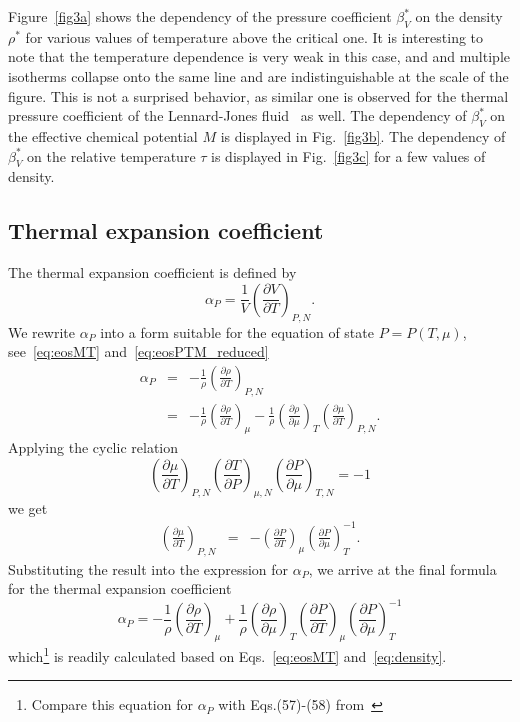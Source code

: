 Figure~\ref{fig3a} shows the dependency of the pressure coefficient $\beta^*_V$ on the density $\rho^*$ for various values of temperature above the critical one. It is interesting to note that the temperature dependence is very weak in this case, and and multiple isotherms collapse onto the same line and are indistinguishable at the scale of the figure. This is not a surprised behavior, as similar one is observed for the thermal pressure coefficient of the Lennard-Jones fluid~\cite{YigzaweSadus2013} as well. The dependency of $\beta^*_V$ on the effective chemical potential $M$ is displayed in Fig.~\ref{fig3b}. The dependency of $\beta^*_V$ on the relative temperature $\tau$ is displayed in Fig.~\ref{fig3c} for a few values of density.

\subsection{Thermal expansion coefficient}
The thermal expansion coefficient is defined by
\begin{equation}
	\alpha_P = \frac{1}{V}\left(\frac{\partial V}{\partial T}\right)_{P,N}.
\end{equation}
We rewrite $\alpha_P$ into a form suitable for the equation of state $P=P(T,\mu)$, see~\eqref{eq:eosMT} and~\eqref{eq:eosPTM_reduced}
\begin{eqnarray}
	\label{eq:alpha_vs_rho}
	\alpha_P & = & -\frac{1}{\rho} \left(\frac{\partial \rho}{\partial T}\right)_{P, N}
	\\
	& = & -\frac{1}{\rho} \left(\frac{\partial \rho}{\partial T}\right)_{\mu} 
	- \frac{1}{\rho} \left(\frac{\partial \rho}{\partial \mu}\right)_{T}
	\left(\frac{\partial \mu}{\partial T}\right)_{P, N}.
\end{eqnarray}
Applying the cyclic relation
\begin{equation*}
	\left(\frac{\partial \mu}{\partial T}\right)_{P, N}
	\left(\frac{\partial T}{\partial P}\right)_{\mu, N}
	\left(\frac{\partial P}{\partial \mu}\right)_{T, N}
	= -1
\end{equation*}
we get
\begin{eqnarray*}
	\left(\frac{\partial \mu}{\partial T}\right)_{P, N} & = & 
	- \left(\frac{\partial P}{\partial T}\right)_{\mu}
	\left(\frac{\partial P}{\partial \mu}\right)^{-1}_{T}.
\end{eqnarray*}
Substituting the result into the expression for $\alpha_P$, we arrive at the final formula for the thermal expansion coefficient
\begin{equation}
	\label{eq:alphaP1}
	\alpha_P = -\frac{1}{\rho}\left(\frac{\partial \rho}{\partial T}\right)_{\mu}
	+ \frac{1}{\rho} \left(\frac{\partial \rho}{\partial \mu}\right)_{T}
	\left(\frac{\partial P}{\partial T}\right)_{\mu}
	\left(\frac{\partial P}{\partial \mu}\right)^{-1}_{T}
\end{equation}
which\footnote{Compare this equation for $\alpha_P$ with Eqs.(57)-(58) from~\cite{StrokerMeier2021}} is readily calculated based on Eqs.~\eqref{eq:eosMT} and~\eqref{eq:density}.

